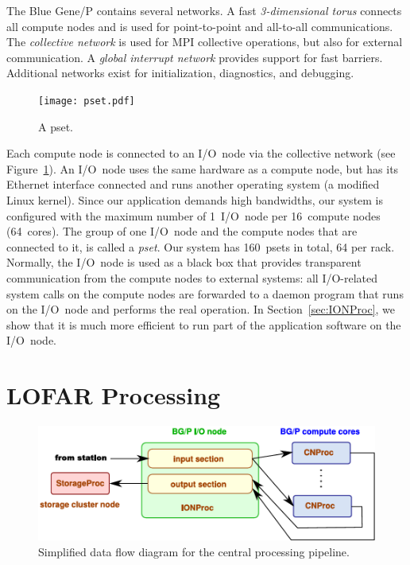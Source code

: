 \documentclass{sig-alternate}
\begin{document}
The Blue Gene/P contains several networks.
A fast \emph{3-dimensional torus\/} connects all compute nodes and is used
for point-to-point and all-to-all communications.
The \emph{collective network\/} is used for MPI collective operations,
but also for external communication.
A \emph{global interrupt network\/} provides support for fast barriers.
Additional networks exist for initialization, diagnostics, and debugging.

\begin{figure}[ht]
\texttt{[image: pset.pdf]}
\caption{A pset.}
\label{fig:pset}
\end{figure}

Each compute node is connected to an I/O~node via the collective network
(see Figure~\ref{fig:pset}).
An I/O~node uses the same hardware as a compute node, but has its Ethernet
interface connected and runs another operating system (a modified Linux kernel).
Since our application demands high bandwidths, our system is configured with
the maximum number of 1~I/O~node per 16~compute nodes (64~cores).
The group of one I/O~node and the compute nodes that are connected to it,
is called a \emph{pset}.
Our system has 160~psets in total, 64 per rack.
Normally, the I/O~node is used as a black box that provides transparent
communication from the compute nodes to external systems: all I/O-related
system calls on the compute nodes are forwarded to a daemon program that runs
on the I/O~node and performs the real operation.
In Section~\ref{sec:IONProc}, we show that it is much more
efficient to run part of the application software on the I/O~node.


\section{LOFAR Processing}
\label{sec:processing}

\begin{figure}[ht]
\includegraphics[width=\columnwidth]{processing-overview.pdf}
\caption{Simplified data flow diagram for the central processing pipeline.}
\label{fig:processing}
\end{figure}
\end{document}

